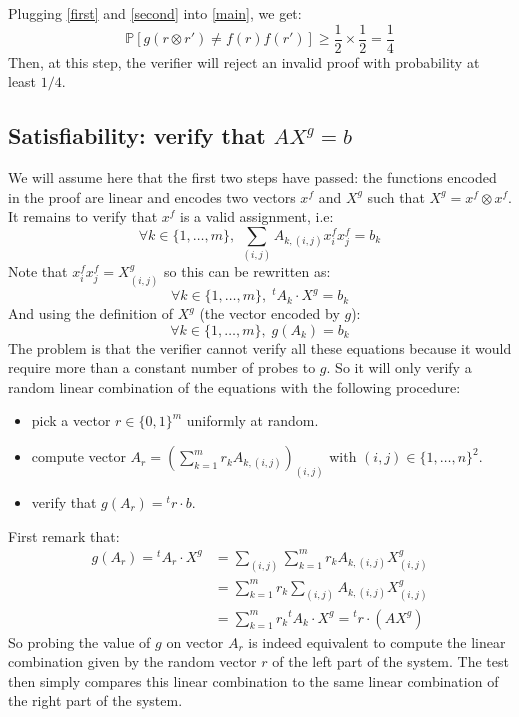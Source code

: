 \documentclass[a4paper,10pt]{article}
\newcommand{\prob}[1]{\mathbb{P}\left[#1\right]}
\theoremstyle{remark}
\begin{document}
Plugging \eqref{first} and \eqref{second} into \eqref{main}, we get:
\begin{displaymath}
\prob{g(r\otimes r')\neq f(r)f(r')}\geq\frac{1}{2}\times\frac{1}{2}=\frac{1}{4}
\end{displaymath}
Then, at this step, the verifier will reject an invalid proof with probability
at least $1/4$.


\subsection{Satisfiability: verify that $AX^g = b$}
We will assume here that the first two steps have passed: the functions
encoded in the proof are linear and encodes two vectors $x^f$ and $X^g$ such
that $X^g = x^f\otimes x^f$. It remains to verify that $x^f$ is a valid
assignment, i.e:
\begin{displaymath}
\forall k\in\{1,\ldots,m\},\;\sum_{(i,j)} A_{k,(i,j)}x^f_ix^f_j=b_k
\end{displaymath}
Note that $x^f_ix^f_j= X^g_{(i,j)}$ so this can be rewritten as:
\begin{displaymath}
\forall k\in\{1,\ldots,m\},\; {}^tA_k\cdot X^g = b_k
\end{displaymath}
And using the definition of $X^g$ (the vector encoded by $g$):
\begin{displaymath}
\forall k\in\{1,\ldots,m\},\; g(A_k) = b_k
\end{displaymath}
The problem is that the verifier cannot verify all these equations because it
would require more than a constant number of probes to $g$. So it will only
verify a random linear combination of the equations with the following
procedure:
\begin{itemize}
\item pick a vector $r\in\{0,1\}^m$ uniformly at random.
\item compute vector $A_r = \left(\sum_{k=1}^m r_kA_{k,(i,j)}\right)_{(i,j)}$
with $(i,j)\in\{1,\ldots,n\}^2$.
\item verify that $g(A_r) = {}^tr\cdot b$.
\end{itemize}

First remark that:
\begin{equation}\label{end}
\begin{split}
g(A_r) =
{}^tA_r\cdot X^g &= \sum_{(i,j)}\sum_{k=1}^m r_kA_{k,(i,j)}X^g_{(i,j)}\\
&= \sum_{k=1}^m r_k \sum_{(i,j)}A_{k,(i,j)}X^g_{(i,j)}\\
&= \sum_{k=1}^m r_k {}^tA_k\cdot X^g = {}^tr\cdot (AX^g)
\end{split}
\end{equation}
So probing the value of $g$ on vector $A_r$ is indeed equivalent to compute the
linear combination given by the random vector $r$ of the left part of the
system. The test then simply compares this linear combination to the same
linear combination of the right part of the system.
\end{document}
